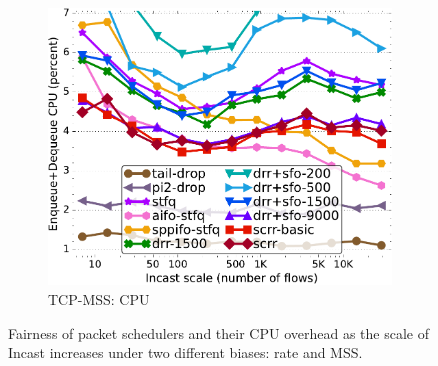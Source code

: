 \begin{figure}[th!]
\begin{subfigure}[t]{.30\linewidth}
    \includegraphics[width=0.95\linewidth]{figs/paral_cn_6t4x1024_mss_2500_kp_comp_methods.pdf}
    \caption{TCP-MSS: CPU}
    \label{fig:fairness-cpu-tcp-mss-full}
  \end{subfigure}
  \vspace{-3mm}
  \caption{\small{Fairness of packet schedulers and their CPU overhead as the scale of Incast increases under two different biases: rate and MSS.}}
  \label{fig:fairness-full}
  \vspace{-0.2cm}
\end{figure}
